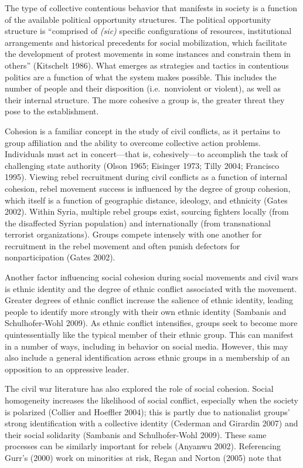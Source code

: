 \documentclass[
  english,
  man]{apa6}
\begin{document}
The type of collective contentious behavior that manifests in society is a
function of the available political opportunity structures. The political
opportunity structure is \enquote{comprised of \emph{(sic)} specific configurations of
resources, institutional arrangements and historical precedents for social
mobilization, which facilitate the development of protest movements in some
instances and constrain them in others} (Kitschelt 1986). What emerges
as strategies and tactics in contentious politics are a function of
what the system makes possible. This includes the number of people and their
disposition (i.e.~nonviolent or violent), as well as their internal structure.
The more cohesive a group is, the greater threat they pose to the establishment.

Cohesion is a familiar concept in the study of civil conflicts, as it pertains
to group affiliation and the ability to overcome collective action problems.
Individuals must act in concert---that is, cohesively---to accomplish the task
of challenging state authority (Olson 1965; Eisinger 1973; Tilly 2004; Francisco 1995).
Viewing rebel recruitment during civil conflicts as a function of internal
cohesion, rebel movement success is influenced by the degree of group cohesion,
which itself is a function of geographic distance, ideology, and ethnicity
(Gates 2002). Within Syria, multiple rebel groups exist, sourcing
fighters locally (from the disaffected Syrian population) and internationally
(from transnational terrorist organizations). Groups compete intensely with one
another for recruitment in the rebel movement and often punish defectors for
nonparticipation (Gates 2002).

Another factor influencing social cohesion during social movements and civil
wars is ethnic identity and the degree of ethnic conflict associated with the
movement. Greater degrees of ethnic conflict increase the salience of ethnic
identity, leading people to identify more strongly with their own ethnic
identity (Sambanis and Schulhofer-Wohl 2009). As ethnic conflict intensifies, groups seek to become
more quintessentially like the typical member of their ethnic group. This can
manifest in a number of ways, including in behavior on social media. However,
this may also include a general identification across ethnic groups in a
membership of an opposition to an oppressive leader.

The civil war literature has also explored the role of social cohesion. Social
homogeneity increases the likelihood of social conflict, especially when the
society is polarized (Collier and Hoeffler 2004); this is partly due to nationalist
groups' strong identification with a collective identity (Cederman and Girardin 2007)
and their social solidarity (Sambanis and Schulhofer-Wohl 2009). These same processes can be
similarly important for rebels (Anyanwu 2002). Referencing Gurr's
(2000) work on minorities at risk, Regan and Norton
(2005) note that
\end{document}
